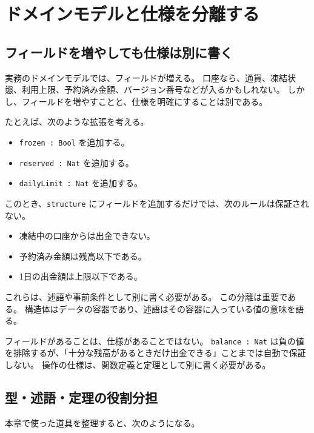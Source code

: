 \section{ドメインモデルと仕様を分離する}

\subsection{フィールドを増やしても仕様は別に書く}

実務のドメインモデルでは、フィールドが増える。
口座なら、通貨、凍結状態、利用上限、予約済み金額、バージョン番号などが入るかもしれない。
しかし、フィールドを増やすことと、仕様を明確にすることは別である。

たとえば、次のような拡張を考える。

\begin{itemize}
\item \texttt{frozen : Bool} を追加する。
\item \texttt{reserved : Nat} を追加する。
\item \texttt{dailyLimit : Nat} を追加する。
\end{itemize}

このとき、\texttt{structure} にフィールドを追加するだけでは、次のルールは保証されない。

\begin{itemize}
\item 凍結中の口座からは出金できない。
\item 予約済み金額は残高以下である。
\item 1日の出金額は上限以下である。
\end{itemize}

これらは、述語や事前条件として別に書く必要がある。
この分離は重要である。
構造体はデータの容器であり、述語はその容器に入っている値の意味を語る。

\begin{warningbox}
フィールドがあることは、仕様があることではない。
\texttt{balance : Nat} は負の値を排除するが、「十分な残高があるときだけ出金できる」ことまでは自動で保証しない。
操作の仕様は、関数定義と定理として別に書く必要がある。
\end{warningbox}

\subsection{型・述語・定理の役割分担}

本章で使った道具を整理すると、次のようになる。

